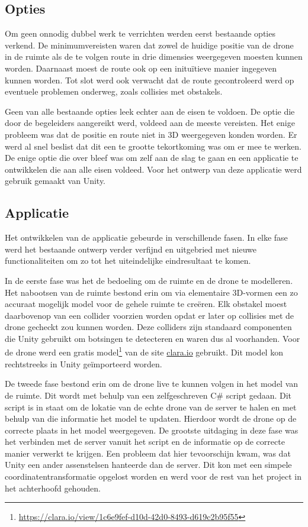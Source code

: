 \subsection{Opties} \label{sec:opties}
Om geen onnodig dubbel werk te verrichten werden eerst bestaande opties verkend. De minimumvereisten waren dat zowel de huidige positie van de drone in de ruimte als de te volgen route in drie dimensies weergegeven moesten kunnen worden. Daarnaast moest de route ook op een inituïtieve manier ingegeven kunnen worden. Tot slot werd ook verwacht dat de route gecontroleerd werd op eventuele problemen onderweg, zoals collisies met obstakels.

Geen van alle bestaande opties leek echter aan de eisen te voldoen. De optie die door de begeleiders aangereikt werd, voldeed aan de meeste vereisten. Het enige probleem was dat de positie en route niet in 3D weergegeven konden worden. Er werd al snel beslist dat dit een te grootte tekortkoming was om er mee te werken. De enige optie die over bleef was om zelf aan de slag te gaan en een applicatie te ontwikkelen die aan alle eisen voldeed. Voor het ontwerp van deze applicatie werd gebruik gemaakt van Unity.

\subsection{Applicatie} \label{sec:unity}
Het ontwikkelen van de applicatie gebeurde in verschillende fasen. In elke fase werd het bestaande ontwerp verder verfijnd en uitgebried met nieuwe functionaliteiten om zo tot het uiteindelijke eindresultaat te komen.

In de eerste fase was het de bedoeling om de ruimte en de drone te modelleren. Het nabootsen van de ruimte bestond erin om via elementaire 3D-vormen een zo accuraat mogelijk model voor de gehele ruimte te creëren. Elk obstakel moest daarbovenop van een collider voorzien worden opdat er later op collisies met de drone gecheckt zou kunnen worden. Deze colliders zijn standaard componenten die Unity gebruikt om botsingen te detecteren en waren dus al voorhanden. Voor de drone werd een gratis model\footnote{\url{https://clara.io/view/1c6e9fef-d10d-42d0-8493-d619c2b95f55}} van de site \url{clara.io} gebruikt. Dit model kon rechtstreeks in Unity geïmporteerd worden.

De tweede fase bestond erin om de drone live te kunnen volgen in het model van de ruimte. Dit wordt met behulp van een zelfgeschreven C\# script gedaan. Dit script is in staat om de lokatie van de echte drone van de server te halen en met behulp van die informatie het model te updaten. Hierdoor wordt de drone op de correcte plaats in het model weergegeven. De grootste uitdaging in deze fase was het verbinden met de server vanuit het script en de informatie op de correcte manier verwerkt te krijgen. Een probleem dat hier tevoorschijn kwam, was dat Unity een ander assenstelsen hanteerde dan de server. Dit kon met een simpele coordinatentransformatie opgelost worden en werd voor de rest van het project in het achterhoofd gehouden.

